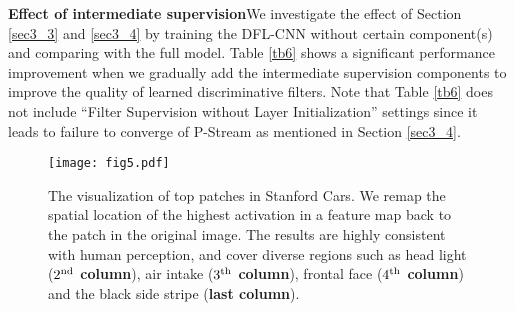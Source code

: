 \documentclass[10pt,twocolumn,letterpaper]{article}
\begin{document}
\begin{table}
\centering
{}
\vspace{1pt}
\caption{\label{tb8}Effect of BBox evaluated on CUB-200-2011.}
\vspace{-10pt}
\end{table}

\noindent\textbf{Effect of intermediate supervision}\quad We investigate the effect of Section
\ref{sec3_3} and \ref{sec3_4} by training the DFL-CNN without certain component(s) and comparing with the full model.
Table \ref{tb6} shows a significant performance improvement when we gradually add the intermediate supervision
components to improve the quality of learned discriminative filters. Note that Table \ref{tb6} does not include ``Filter
Supervision without Layer Initialization'' settings since it leads to failure to converge of P-Stream as mentioned in Section
\ref{sec3_4}.

\begin{figure*}
\begin{center}
\texttt{[image: fig5.pdf]}
\end{center}
   \vspace{-10pt}
\caption{\label{fig5} The visualization of top patches in Stanford Cars. We remap the spatial location of the highest
activation in a feature map back to the patch in the original image. The results are highly consistent
with human perception, and cover diverse regions such as head light
(\textbf{$2^{\rm nd}$ column}), air intake (\textbf{$3^{\rm th}$ column}), frontal face (\textbf{$4^{\rm th}$ column})
and the black side stripe (\textbf{last column}).}
   \vspace{-10pt}
\end{figure*}
\end{document}
